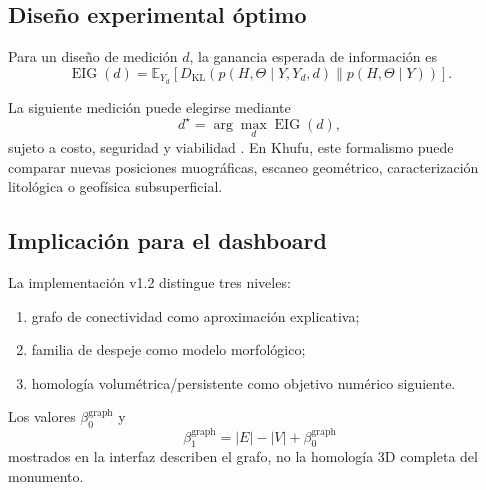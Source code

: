 \subsection{Diseño experimental óptimo}

Para un diseño de medición \(d\), la ganancia esperada de información es
\[
\boxed{
\operatorname{EIG}(d)
=
\mathbb E_{Y_d}
\left[
D_{\mathrm{KL}}
\left(
p(H,\Theta\mid Y,Y_d,d)
\|
p(H,\Theta\mid Y)
\right)
\right].
}
\]

La siguiente medición puede elegirse mediante
\[
d^\star
=
\arg\max_d
\operatorname{EIG}(d),
\]
sujeto a costo, seguridad y viabilidad \cite{alexanderian2021}. En Khufu, este formalismo puede comparar nuevas posiciones muográficas, escaneo geométrico, caracterización litológica o geofísica subsuperficial.

\subsection{Implicación para el dashboard}

La implementación v1.2 distingue tres niveles:

\begin{enumerate}
\item grafo de conectividad como aproximación explicativa;
\item familia de despeje como modelo morfológico;
\item homología volumétrica/persistente como objetivo numérico siguiente.
\end{enumerate}

Los valores \(\beta_0^{\mathrm{graph}}\) y
\[
\beta_1^{\mathrm{graph}}
=
|E|-|V|+\beta_0^{\mathrm{graph}}
\]
mostrados en la interfaz describen el grafo, no la homología 3D completa del monumento.
